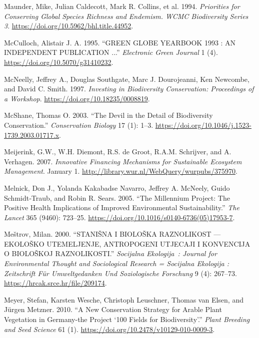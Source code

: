 \begin{CSLReferences}{1}{1}
Maunder, Mike, Julian Caldecott, Mark R. Collins, et al. 1994.
\emph{Priorities for Conserving Global Species Richness and Endemism.
WCMC Biodiversity Series 3}.
\url{https://doi.org/10.5962/bhl.title.44952}.

McCulloch, Alistair J. A. 1995. {``GREEN GLOBE YEARBOOK 1993 : AN
INDEPENDENT PUBLICATION ...''} \emph{Electronic Green Journal} 1 (4).
\url{https://doi.org/10.5070/g31410232}.

McNeelly, Jeffrey A., Douglas Southgate, Marc J. Dourojeanni, Ken
Newcombe, and David C. Smith. 1997. \emph{Investing in Biodiversity
Conservation: Proceedings of a Workshop}.
\url{https://doi.org/10.18235/0008819}.

McShane, Thomas O. 2003. {``The Devil in the Detail of Biodiversity
Conservation.''} \emph{Conservation Biology} 17 (1): 1--3.
\url{https://doi.org/10.1046/j.1523-1739.2003.01717.x}.

Meijerink, G.W., W.H. Diemont, R.S. de Groot, R.A.M. Schrijver, and A.
Verhagen. 2007. \emph{Innovative Financing Mechanisms for Sustainable
Ecosystem Management}. January 1.
\url{http://library.wur.nl/WebQuery/wurpubs/375970}.

Melnick, Don J., Yolanda Kakabadse Navarro, Jeffrey A. McNeely, Guido
Schmidt‐Traub, and Robin R. Sears. 2005. {``The Millennium Project: The
Positive Health Implications of Improved Environmental
Sustainability.''} \emph{The Lancet} 365 (9460): 723--25.
\url{https://doi.org/10.1016/s0140-6736(05)17953-7}.

Meštrov, Milan. 2000. {``STANIŠNA I BIOLOŠKA RAZNOLIKOST --- EKOLOŠKO
UTEMELJENJE, ANTROPOGENI UTJECAJI I KONVENCIJA O BIOLOŠKOJ
RAZNOLIKOSTI.''} \emph{Socijalna Ekologija~: Journal for Environmental
Thought and Sociological Research = Socijalna Ekologija : Zeitschrift
Für Umweltgedanken Und Soziologische Forschung} 9 (4): 267--73.
\url{https://hrcak.srce.hr/file/209174}.

Meyer, Stefan, Karsten Wesche, Christoph Leuschner, Thomas van Elsen,
and Jürgen Metzner. 2010. {``A New Conservation Strategy for Arable
Plant Vegetation in Germany-the Project {`100 Fields for
Biodiversity'}.''} \emph{Plant Breeding and Seed Science} 61 (1).
\url{https://doi.org/10.2478/v10129-010-0009-3}.


\end{CSLReferences}
